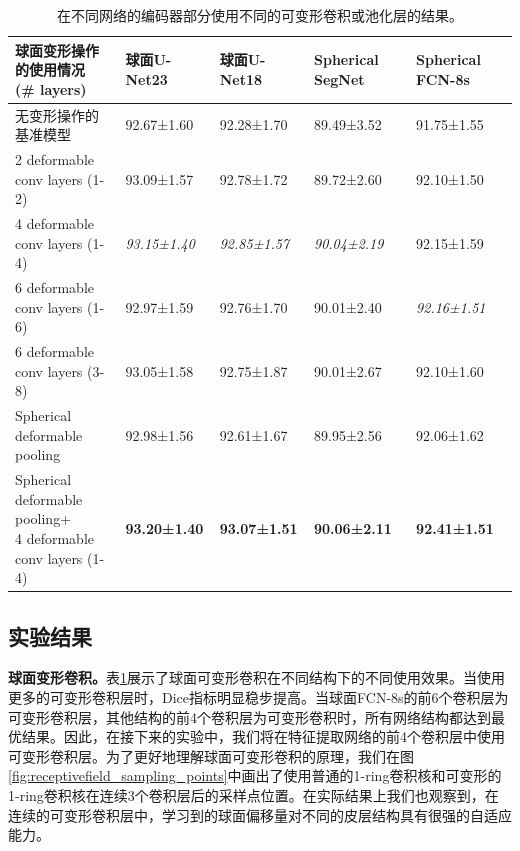 \begin{table}[t]
		\caption{\label{tab:婴儿数据集分区结果}在不同网络的编码器部分使用不同的可变形卷积或池化层的结果。}
		\centering
		\begin{tabularx}{\linewidth}{l|X<{\centering}|X<{\centering}|X<{\centering}|X<{\centering}}
			\hline
			\makecell{球面变形操作的使用情况\\ (\# layers)}& 球面U-Net23      & 球面U-Net18     &  Spherical SegNet & Spherical FCN-8s   \\
			\hline
			无变形操作的基准模型                    &  92.67±1.60            &	92.28±1.70       &  89.49±3.52       	 &		91.75±1.55 \\   
			\hline
			2 deformable conv layers (1-2)           &	93.09±1.57           &	92.78±1.72		 &  89.72±2.60           &	92.10±1.50  \\
			4 deformable conv layers (1-4)           & 	\textit{93.15±1.40}	& \textit{92.85±1.57}	& \textit{90.04±2.19}			&92.15±1.59  \\
			6 deformable conv layers (1-6)           & 	92.97±1.59	&		92.76±1.70	&		90.01±2.40	&		\textit{92.16±1.51} \\
			6 deformable conv layers (3-8) 	         &	93.05±1.58	&		92.75±1.87	&		90.01±2.67		&	92.10±1.60 \\
			\hline
			Spherical deformable pooling            &  	92.98±1.56	&	92.61±1.67	&		89.95±2.56	&		92.06±1.62\\
			\hline
			\makecell{Spherical deformable pooling+\\4 deformable conv layers (1-4)} &	\textbf{93.20±1.40} &	\textbf{93.07±1.51}	& \textbf{90.06±2.11}	&  \textbf{92.41±1.51}	 \\
			\hline 
		\end{tabularx}
\end{table}

\subsection{实验结果}
\textbf{球面变形卷积。}表\ref{tab:婴儿数据集分区结果}展示了球面可变形卷积在不同结构下的不同使用效果。当使用更多的可变形卷积层时，Dice指标明显稳步提高。当球面FCN-8s的前6个卷积层为可变形卷积层，其他结构的前4个卷积层为可变形卷积时，所有网络结构都达到最优结果。因此，在接下来的实验中，我们将在特征提取网络的前4个卷积层中使用可变形卷积层。为了更好地理解球面可变形卷积的原理，我们在图\ref{fig:receptivefield_sampling_points}中画出了使用普通的1-ring卷积核和可变形的1-ring卷积核在连续3个卷积层后的采样点位置。在实际结果上我们也观察到，在连续的可变形卷积层中，学习到的球面偏移量对不同的皮层结构具有很强的自适应能力。

